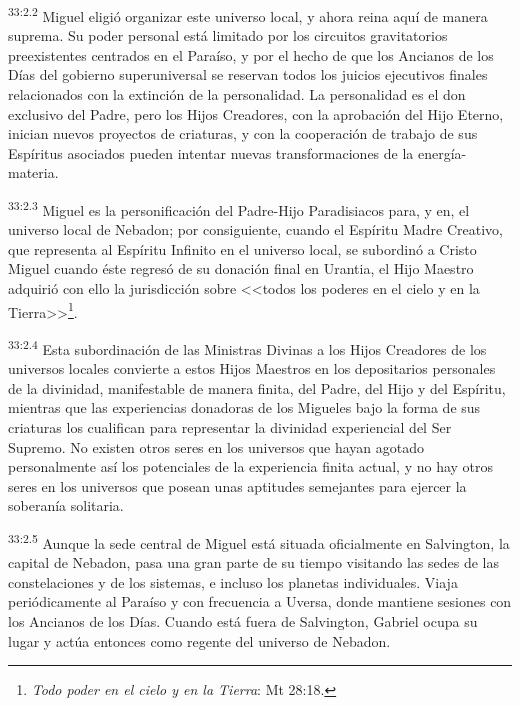 \par
\textsuperscript{33:2.2} Miguel eligió organizar este universo local, y ahora reina aquí de manera suprema. Su poder personal está limitado por los circuitos gravitatorios preexistentes centrados en el Paraíso, y por el hecho de que los Ancianos de los Días del gobierno superuniversal se reservan todos los juicios ejecutivos finales relacionados con la extinción de la personalidad. La personalidad es el don exclusivo del Padre, pero los Hijos Creadores, con la aprobación del Hijo Eterno, inician nuevos proyectos de criaturas, y con la cooperación de trabajo de sus Espíritus asociados pueden intentar nuevas transformaciones de la energía-materia.

\par
\textsuperscript{33:2.3} Miguel es la personificación del Padre-Hijo Paradisiacos para, y en, el universo local de Nebadon; por consiguiente, cuando el Espíritu Madre Creativo, que representa al Espíritu Infinito en el universo local, se subordinó a Cristo Miguel cuando éste regresó de su donación final en Urantia, el Hijo Maestro adquirió con ello la jurisdicción sobre <<todos los poderes en el cielo y en la Tierra>>\footnote{\textit{Todo poder en el cielo y en la Tierra}: Mt 28:18.}.

\par
\textsuperscript{33:2.4} Esta subordinación de las Ministras Divinas a los Hijos Creadores de los universos locales convierte a estos Hijos Maestros en los depositarios personales de la divinidad, manifestable de manera finita, del Padre, del Hijo y del Espíritu, mientras que las experiencias donadoras de los Migueles bajo la forma de sus criaturas los cualifican para representar la divinidad experiencial del Ser Supremo. No existen otros seres en los universos que hayan agotado personalmente así los potenciales de la experiencia finita actual, y no hay otros seres en los universos que posean unas aptitudes semejantes para ejercer la soberanía solitaria.

\par
\textsuperscript{33:2.5} Aunque la sede central de Miguel está situada oficialmente en Salvington, la capital de Nebadon, pasa una gran parte de su tiempo visitando las sedes de las constelaciones y de los sistemas, e incluso los planetas individuales. Viaja periódicamente al Paraíso y con frecuencia a Uversa, donde mantiene sesiones con los Ancianos de los Días. Cuando está fuera de Salvington, Gabriel ocupa su lugar y actúa entonces como regente del universo de Nebadon.


